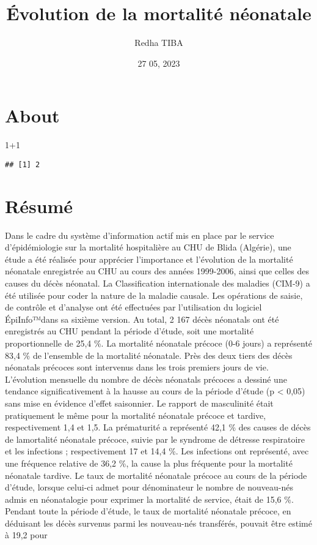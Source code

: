\documentclass[
]{book}
\title{Évolution de la mortalité néonatale}
\author{Redha TIBA}
\date{27 05, 2023}
\newenvironment{Shaded}{\begin{snugshade}}{\end{snugshade}}
\newcommand{\DecValTok}[1]{\textcolor[rgb]{0.00,0.00,0.81}{#1}}
\newcommand{\SpecialCharTok}[1]{\textcolor[rgb]{0.00,0.00,0.00}{#1}}
\begin{document}
\maketitle

{
\setcounter{tocdepth}{1}
\tableofcontents
}
\hypertarget{about}{%
\chapter{About}\label{about}}

\begin{Shaded}
\begin{Highlighting}[]
\DecValTok{1}\SpecialCharTok{+}\DecValTok{1}
\end{Highlighting}
\end{Shaded}

\begin{verbatim}
## [1] 2
\end{verbatim}

\hypertarget{ruxe9sumuxe9}{%
\chapter{Résumé}\label{ruxe9sumuxe9}}

\citet{tibaredha}

Dans le cadre du système d'information actif mis
en place par le service d'épidémiologie sur la mortalité
hospitalière au CHU de Blida (Algérie), une étude a été
réalisée pour apprécier l'importance et l'évolution de la
mortalité néonatale enregistrée au CHU au cours des années
1999-2006, ainsi que celles des causes du décès néonatal.
La Classification internationale des maladies (CIM-9) a
été utilisée pour coder la nature de la maladie causale. Les
opérations de saisie, de contrôle et d'analyse ont été effectuées
par l'utilisation du logiciel ÉpiInfo™dans sa sixième version.
Au total, 2 167 décès néonatals ont été enregistrés au CHU
pendant la période d'étude, soit une mortalité proportionnelle
de 25,4 \%. La mortalité néonatale précoce (0-6 jours) a
représenté 83,4 \% de l'ensemble de la mortalité néonatale.
Près des deux tiers des décès néonatals précoces sont
intervenus dans les trois premiers jours de vie. L'évolution
mensuelle du nombre de décès néonatals précoces a dessiné
une tendance significativement à la hausse au cours de la
période d'étude (p \textless{} 0,05) sans mise en évidence d'effet
saisonnier. Le rapport de masculinité était pratiquement le
même pour la mortalité néonatale précoce et tardive, respectivement
1,4 et 1,5. La prématurité a représenté 42,1 \% des
causes de décès de lamortalité néonatale précoce, suivie par le
syndrome de détresse respiratoire et les infections ; respectivement
17 et 14,4 \%. Les infections ont représenté, avec une
fréquence relative de 36,2 \%, la cause la plus fréquente pour
la mortalité néonatale tardive. Le taux de mortalité néonatale
précoce au cours de la période d'étude, lorsque celui-ci admet
pour dénominateur le nombre de nouveau-nés admis en
néonatalogie pour exprimer la mortalité de service, était de
15,6 \%. Pendant toute la période d'étude, le taux de mortalité
néonatale précoce, en déduisant les décès survenus parmi
les nouveau-nés transférés, pouvait être estimé à 19,2 pour
\end{document}
